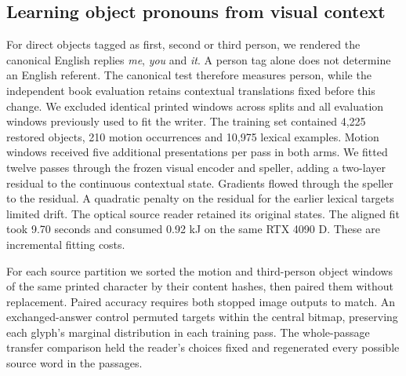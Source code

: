 \subsection*{Learning object pronouns from visual context}
For direct objects tagged as first, second or third person, we rendered the canonical English replies \textit{me}, \textit{you} and \textit{it}. A person tag alone does not determine an English referent. The canonical test therefore measures person, while the independent book evaluation retains contextual translations fixed before this change. We excluded identical printed windows across splits and all evaluation windows previously used to fit the writer. The training set contained 4,225 restored objects, 210 motion occurrences and 10,975 lexical examples. Motion windows received five additional presentations per pass in both arms. We fitted twelve passes through the frozen visual encoder and speller, adding a two-layer residual to the continuous contextual state. Gradients flowed through the speller to the residual. A quadratic penalty on the residual for the earlier lexical targets limited drift. The optical source reader retained its original states. The aligned fit took 9.70 seconds and consumed 0.92 kJ on the same RTX 4090 D. These are incremental fitting costs.

For each source partition we sorted the motion and third-person object windows of the same printed character by their content hashes, then paired them without replacement. Paired accuracy requires both stopped image outputs to match. An exchanged-answer control permuted targets within the central bitmap, preserving each glyph's marginal distribution in each training pass. The whole-passage transfer comparison held the reader's choices fixed and regenerated every possible source word in the passages.
